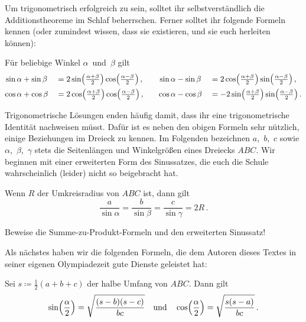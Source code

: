 Um trigonometrisch erfolgreich zu sein, solltet ihr selbstverständlich die Additionstheoreme im Schlaf beherrschen.
Ferner solltet ihr folgende Formeln kennen (oder zumindest wissen, dass sie existieren, und sie euch herleiten können):
\begin{satzmitnamen}
	Für beliebige Winkel $\alpha$~und~$\beta$ gilt
	\begin{alignat*}{4}
		\sin\alpha&+\sin\beta &&= 2\sin\parens*{\tfrac{\alpha+\beta}{2}}\cos\parens*{\tfrac{\alpha-\beta}{2}}\,, & \sin\alpha&-\sin\beta &&= 2\cos\parens*{\tfrac{\alpha+\beta}{2}}\sin\parens*{\tfrac{\alpha-\beta}{2}}\,,\\
		\cos\alpha&+\cos\beta &&= 2\cos\parens*{\tfrac{\alpha+\beta}{2}}\cos\parens*{\tfrac{\alpha-\beta}{2}}\,,\quad & \cos\alpha&-\cos\beta &&= -2\sin\parens*{\tfrac{\alpha+\beta}{2}}\sin\parens*{\tfrac{\alpha-\beta}{2}}\,.
	\end{alignat*}
\end{satzmitnamen}

Trigonometrische Lösungen enden häufig damit, dass ihr eine trigonometrische Identität nachweisen müsst. Dafür ist es neben den obigen Formeln sehr nützlich, einige Beziehungen im Dreieck zu kennen. Im Folgenden bezeichnen $a$,~$b$,~$c$ sowie $\alpha$,~$\beta$,~$\gamma$ stets die Seitenlängen und Winkelgrößen eines Dreiecks $ABC$. Wir beginnen mit einer erweiterten Form des Sinussatzes, die euch die Schule wahrscheinlich (leider) nicht so beigebracht hat.

\begin{satzmitnamen}
	Wenn $R$ der Umkreisradius von $ABC$ ist, dann gilt
	\begin{equation*}
		\frac{a}{\sin\alpha}=\frac{b}{\sin\beta}=\frac{c}{\sin\gamma}=2R\,.
	\end{equation*}
\end{satzmitnamen}

\begin{aufgabe*}
	Beweise die Summe-zu-Produkt-Formeln und den erweiterten Sinussatz!
\end{aufgabe*}

Als nächstes haben wir die folgenden Formeln, die dem Autoren dieses Textes in seiner eigenen Olympiadezeit gute Dienste geleistet hat:
\begin{satzmitnamen}[Halbwinkelformel]
	Sei $s\coloneqq \frac12(a+b+c)$ der halbe Umfang von $ABC$. Dann gilt
	\begin{equation*}
		\sin\parens*{\frac{\alpha}{2}}=\sqrt{\frac{(s-b)(s-c)}{bc}}\quad\text{und}\quad\cos\parens*{\frac{\alpha}{2}}=\sqrt{\frac{s(s-a)}{bc}}\,.
	\end{equation*}
\end{satzmitnamen}

